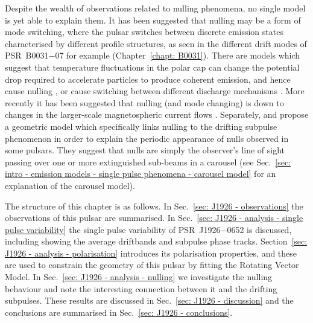 Despite the wealth of observations related to nulling phenomena, no single model is yet able to explain them. It has been suggested that nulling may be a form of mode switching, where the pulsar switches between discrete emission states characterised by different profile structures, as seen in the different drift modes of PSR~B0031$-$07 for example (Chapter~\ref{chapt: B0031}). There are models which suggest that temperature fluctuations in the polar cap can change the potential drop required to accelerate particles to produce coherent emission, and hence cause nulling \citep{Cxxx1981, DCHR1986}, or cause switching between different discharge mechanisms \citep{DHxx1986, ZQLH1997, ZQHx1997}. More recently it has been suggested that nulling (and mode changing) is down to changes in the larger-scale magnetospheric current flows \citep{WMJx2007,LHK+2010,Txxx2010b}. Separately, \citet{HRxx2007,HRxx2009} and \citet{RWxx2008} propose a geometric model which specifically links nulling to the drifting subpulse phenomenon in order to explain the periodic appearance of nulls observed in some pulsars. They suggest that nulls are simply the observer's line of sight passing over one or more extinguished sub-beams in a carousel (see Sec.~\ref{sec: intro - emission models - single pulse phenomena - carousel model} for an explanation of the carousel model).


The structure of this chapter is as follows. In Sec.~\ref{sec: J1926 - observations} the observations of this pulsar are summarised. In Sec.~\ref{sec: J1926 - analysis - single pulse variability} the single pulse variability of PSR~J1926$-$0652 is discussed, including showing the average driftbands and subpulse phase tracks. Section~\ref{sec: J1926 - analysis - polarisation} introduces its polarisation properties, and these are used to constrain the geometry of this pulsar by fitting the Rotating Vector Model. In Sec.~\ref{sec: J1926 - analysis - nulling} we investigate the nulling behaviour and note the interesting connection between it and the drifting subpulses. These results are discussed in Sec.~\ref{sec: J1926 - discussion} and the conclusions are summarised in Sec.~\ref{sec: J1926 - conclusions}.




